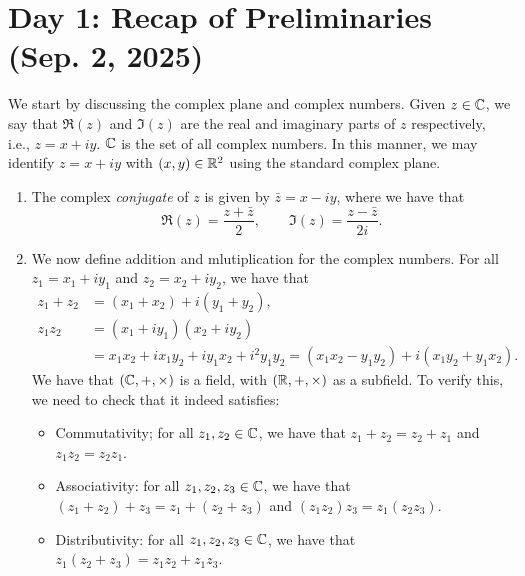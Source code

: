 \section{Day 1: Recap of Preliminaries (Sep. 2, 2025)}
We start by discussing the complex plane and complex numbers. Given $z \in \mathbb C$, we say that $\Re(z)$ and $\Im(z)$ are the real and imaginary parts of $z$ respectively, i.e., $z = x + iy$. $\mathbb C$ is the set of all complex numbers. In this manner, we may identify $z = x + iy$ with $(x, y) \in \mathbb R^2$ using the standard complex plane.
\begin{enumerate}[label=(\alph*)]
    \item The complex \textit{conjugate} of $z$ is given by $\bar{z} = x - iy$, where we have that
    \[ \Re(z) = \frac{z + \bar{z}}{2}, \qquad \Im(z) = \frac{z - \bar{z}}{2i}. \]

    \item We now define addition and mlutiplication for the complex numbers. For all $z_1 = x_1 + i y_1$ and $z_2 = x_2 + i y_2$, we have that
    \begin{align*}
        z_1 + z_2 &= (x_1 + x_2) + i (y_1 + y_2), \\
        z_1 z_2 &= (x_1 + iy_1) (x_2 + iy_2) \\
        &= x_1x_2 + ix_1y_2 + iy_1x_2 + i^2 y_1y_2 = (x_1x_2 - y_1y_2) + i(x_1y_2 + y_1x_2).
    \end{align*}
    We have that $(\mathbb C, +, \times)$ is a field, with $(\mathbb R, +, \times)$ as a subfield. To verify this, we need to check that it indeed satisfies:
    \begin{itemize}
        \item Commutativity; for all $z_1, z_2 \in \mathbb C$, we have that $z_1 + z_2 = z_2 + z_1$ and $z_1z_2 = z_2z_1$.
        \item Associativity: for all $z_1, z_2, z_3 \in \mathbb C$, we have that $(z_1 + z_2) + z_3 = z_1 + (z_2 + z_3)$ and $(z_1z_2)z_3 = z_1(z_2z_3)$.
        \item Distributivity: for all $z_1, z_2, z_3 \in \mathbb C$, we have that $z_1(z_2 + z_3) = z_1z_2 + z_1z_3$.
    \end{itemize}


\end{enumerate}
